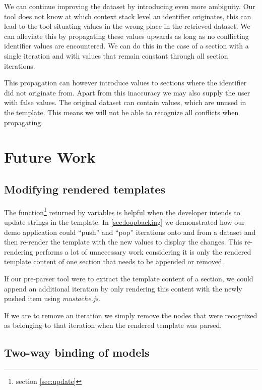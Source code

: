 \documentclass[thesis.tex]{subfiles}
\begin{document}
We can continue improving the dataset by introducing even more ambiguity.
Our tool does not know at which context stack level an identifier originates,
this can lead to the tool situating values in the wrong place in the retrieved
dataset. We can alleviate this by propagating these values upwards as long as no
conflicting identifier values are encountered. We can do this in the case of a
section with a single iteration and with values that remain constant through all
section iterations.

This propagation can however introduce values to sections where the identifier
did not originate from. Apart from this inaccuracy we may also supply the user
with false values. The original dataset can contain values, which are unused in
the template. This means we will not be able to recognize all conflicts when
propagating.

\section{Future Work}

\subsection{Modifying rendered templates}
\label{sec:update-dom}
The  function\footnote{section \ref{sec:update}} returned by
variables is helpful when the developer intends to update strings in the
template. In \ref{sec:loopbacking} we demonstrated how our demo application
could ``push'' and ``pop'' iterations onto and from a dataset and then re-render
the template with the new values to display the changes.
This re-rendering performs a lot of unnecessary work considering it is only
the rendered template content of one section that needs to be appended or
removed.

If our pre-parser tool were to extract the template content of a section, we
could append an additional iteration by only rendering this content with the
newly pushed item using \emph{mustache.js}.

If we are to remove an iteration we simply remove the nodes that were recognized
as belonging to that iteration when the rendered template was parsed.

\subsection{Two-way binding of models}
\end{document}
